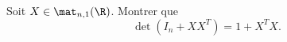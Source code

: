 \begin{enonce}
\begin{exercise}[ID={RMS135 E1408},subtitle={IMT MP 2024},tags={},difficulty={}]
Soit $X \in \mat_{n,1}(\R)$. Montrer que 
\begin{equation*}
  \det\left(I_n + X X^T\right) = 1 + X^T X.
\end{equation*}
\end{exercise}
\begin{solution}
\end{solution}
\end{enonce}
